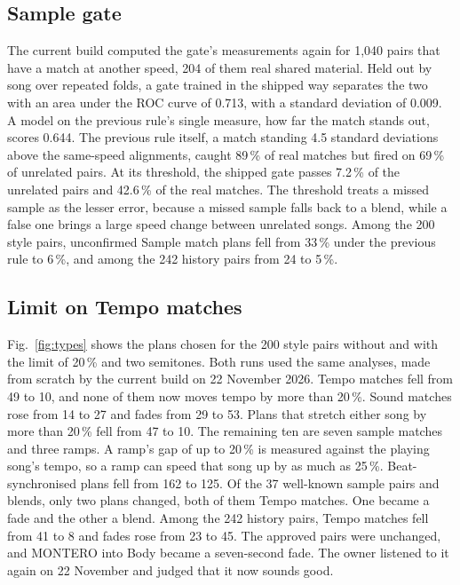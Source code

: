 \documentclass[conference,a4paper]{IEEEtran}
\newcommand{\q}[1]{\textquotedbl{}#1\textquotedbl{}}
\begin{document}
\subsection{Sample gate}
The current build computed the gate's measurements again for 1,040 pairs that have a match at
another speed, 204 of them real shared material. Held out by song over repeated folds, a gate
trained in the shipped way separates the two with an area under the ROC curve of 0.713, with a
standard deviation of 0.009. A model on the previous rule's single measure, how far the match
stands out, scores 0.644. The previous rule itself, a match standing 4.5 standard deviations
above the same-speed alignments, caught 89\,\% of real matches but fired on 69\,\% of unrelated
pairs. At its threshold, the shipped gate passes 7.2\,\% of the unrelated pairs and 42.6\,\% of the
real matches. The threshold treats a missed sample as the lesser error, because a missed sample
falls back to a blend, while a false one brings a large speed change between unrelated songs.
Among the 200 style pairs, unconfirmed \q{Sample match} plans fell from 33\,\% under the
previous rule to 6\,\%, and among the 242 history pairs from 24 to 5\,\%.

\subsection{Limit on Tempo matches}
Fig.~\ref{fig:types} shows the plans chosen for the 200 style pairs without and with the limit of
20\,\% and two semitones. Both runs used the same analyses, made from scratch by the current build
on 22 November 2026. Tempo matches fell from 49 to 10, and none of them
now moves tempo by more than 20\,\%. Sound matches rose from 14 to 27 and fades from 29 to 53. Plans
that stretch either song by more than 20\,\% fell from 47 to 10. The remaining ten are seven sample
matches and three ramps. A ramp's gap of up to 20\,\% is measured against the playing song's tempo,
so a ramp can speed that song up by as much as 25\,\%. Beat-synchronised plans fell from 162 to 125.
Of the 37 well-known sample pairs and blends, only two plans changed, both of them Tempo matches.
One became a fade and the other a blend. Among the 242 history pairs, Tempo matches fell from 41
to 8 and fades rose from 23 to 45. The approved pairs were unchanged, and MONTERO into Body became
a seven-second fade. The owner listened to it again on 22 November and judged that it now sounds
good.
\end{document}
